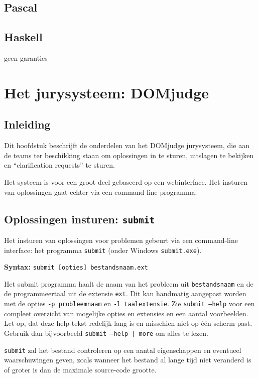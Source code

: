 \documentclass[11pt,titlepage,a4paper]{article}
\newcommand{\DOMjudge}{DOMjudge }
\begin{document}
\subsection{Pascal}

\subsection{Haskell}
geen garanties


\section{Het jurysysteem: \DOMjudge}

\subsection{Inleiding}

Dit hoofdstuk beschrijft de onderdelen van het \DOMjudge
jurysysteem, die aan de teams ter beschikking staan om oplossingen in
te sturen, uitslagen te bekijken en ``clarification requests'' te
sturen.

Het systeem is voor een groot deel gebaseerd op een webinterface. Het
insturen van oplossingen gaat echter via een command-line programma.

\subsection{Oplossingen insturen: \texttt{submit}}\label{submit}

Het insturen van oplossingen voor problemen gebeurt via een
command-line interface: het programma \texttt{submit} (onder Windows
\texttt{submit.exe}).

\textbf{Syntax:} \texttt{submit [opties] bestandsnaam.ext}

Het submit programma haalt de naam van het probleem uit
\texttt{bestandsnaam} en de de programmeertaal uit de extensie
\texttt{ext}. Dit kan handmatig aangepast worden met de opties
\texttt{-p probleemnaam} en \texttt{-l taalextensie}. Zie
\texttt{submit --help} voor een compleet overzicht van mogelijke
opties en extensies en een aantal voorbeelden. Let op, dat deze help-tekst
redelijk lang is en misschien niet op \'e\'en scherm past. Gebruik dan
bijvoorbeeld \texttt{submit --help | more} om alles te lezen.

\texttt{submit} zal het bestand controleren op een aantal eigenschappen
en eventueel waarschuwingen geven, zoals wanneer het bestand al lange
tijd niet veranderd is of groter is dan de maximale source-code grootte.
\end{document}
